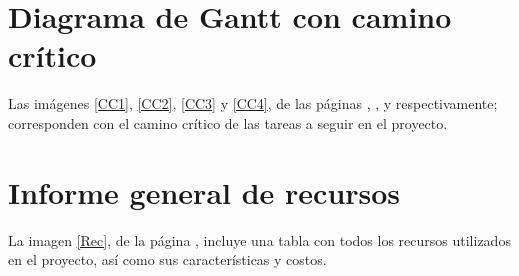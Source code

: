 \documentclass[11pt,a4paper,spanish,twoside]{book}
\begin{document}
\begin{sidewaystable}
\end{sidewaystable}

\begin{sidewaystable}
\end{sidewaystable}

\begin{sidewaystable}
\end{sidewaystable}

\section{Diagrama de Gantt con camino crítico}
Las imágenes \ref{CC1}, \ref{CC2}, \ref{CC3} y \ref{CC4}, de las páginas
\pageref{CC1}, \pageref{CC2}, \pageref{CC3} y \pageref{CC4} respectivamente;
corresponden con el camino crítico de las tareas a seguir en el proyecto.

\begin{sidewaystable}
\end{sidewaystable}

\begin{sidewaystable}
\end{sidewaystable}

\begin{sidewaystable}
\end{sidewaystable}

\begin{sidewaystable}
\end{sidewaystable}

\section{Informe general de recursos}
La imagen \ref{Rec}, de la página \pageref{Rec}, incluye una tabla con todos
los recursos utilizados en el proyecto, así como sus características y costos.
\begin{sidewaystable}
\end{sidewaystable}
\end{document}
